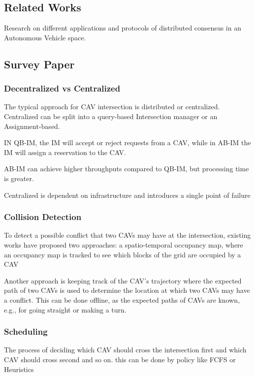 \documentclass[fleqn,10pt]{olplainarticle}
\begin{document}
\subsection*{Related Works}

Research on different applications and protocols of distributed consensus in an Autonomous Vehicle space. 

\subsection{Survey Paper}

\subsubsection{Decentralized vs Centralized }
The typical approach for CAV intersection is distributed or centralized. Centralized can be split into a query-based Intersection manager or an Assignment-based. 

IN QB-IM, the IM will accept or reject requests from a CAV, while in AB-IM the IM will assign a reservation to the CAV. 

AB-IM can achieve higher throughputs compared to QB-IM, but processing time is greater.

Centralized is dependent on infrastructure and introduces a single point of failure 

\subsubsection{Collision Detection}
To detect a possible conflict that two CAVs may have at the intersection, existing works have proposed two approaches: 
a spatio-temporal occupancy map, where an occupancy map is tracked to see which blocks of the grid are occupied by a CAV

Another approach is keeping track of the CAV's trajectory where the expected path of two CAVs is used to determine the location at which two CAVs may have a conflict. This can be done offline, as the expected paths of CAVs are known, e.g., for going straight or making a turn.


\subsubsection{Scheduling }
The process of deciding which CAV should cross the intersection first and which CAV should cross second and so on. this can be done by policy like FCFS or Heuristics
\end{document}
